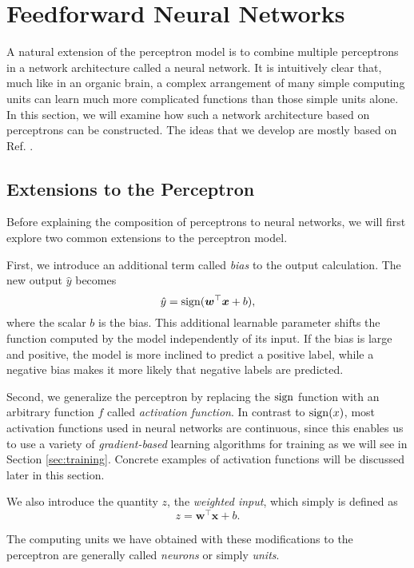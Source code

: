 \section{Feedforward Neural Networks}
\label{sec:feedforward_neural_networks}
A natural extension of the perceptron model is to combine multiple perceptrons in a network architecture called a neural network. It is intuitively clear that, much like in an organic brain, a complex arrangement of many simple computing units can learn much more complicated functions than those simple units alone. In this section, we will examine how such a network architecture based on perceptrons can be constructed. The ideas that we develop are mostly based on Ref. \cite[Ch.\,6]{DBLP:books/daglib/0040158}.

\subsection{Extensions to the Perceptron}
Before explaining the composition of perceptrons to neural networks, we will first explore two common extensions to the perceptron model.

First, we introduce an additional term called \emph{bias} to the output calculation. The new output $\hat{y}$ becomes
\begin{equation}
\hat{y} = \operatorname{sign}(\bm{w}^\top\bm{x} + b),
\end{equation}
where the scalar $b$ is the bias. This additional learnable parameter shifts the function computed by the model independently of its input. If the bias is large and positive, the model is more inclined to predict a positive label, while a negative bias makes it more likely that negative labels are predicted.

Second, we generalize the perceptron by replacing the $\operatorname{sign}$ function with an arbitrary function $f$ called \emph{activation function}. In contrast to $\operatorname{sign}(x)$, most activation functions used in neural networks are continuous, since this enables us to use a variety of \emph{gradient-based} learning algorithms for training as we will see in Section \ref{sec:training}. Concrete examples of activation functions will be discussed later in this section.

We also introduce the quantity $z$, the \emph{weighted input}, which simply is defined as
\begin{equation}
z = \bm{w}^\top\bm{x} + b.
\end{equation}

The computing units we have obtained with these modifications to the perceptron are generally called \emph{neurons} or simply \emph{units}.

